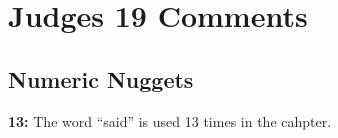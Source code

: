 \section{Judges 19 Comments}

\subsection{Numeric Nuggets}
\textbf{13: } The word ``said'' is used 13 times in the cahpter.